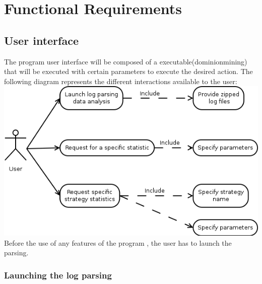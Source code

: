 \documentclass{scrreprt}
\begin{document}
\chapter{Functional Requirements}

\section{User interface}
The program user interface will be composed of a executable(dominionmining) that will be
executed with certain parameters to execute the desired action.
The following diagram represents the different interactions available to the user:\\
\includegraphics[scale=0.45,keepaspectratio]{UseCaseParsing}\\
Before the use of any features of the program , the user has to launch the parsing.
\subsection{Launching the log parsing}
\end{document}
